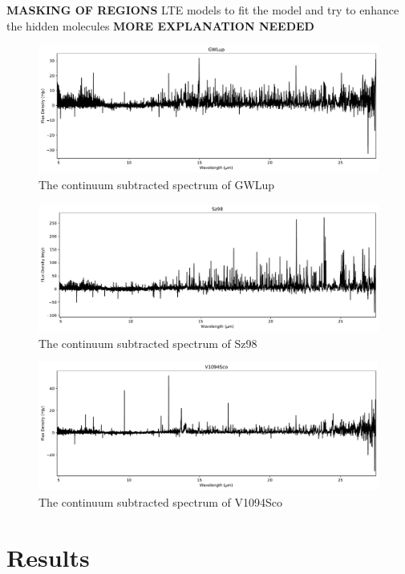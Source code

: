 \documentclass[oneside, single, authoryear, semicolon]{lion-msc}
\newcommand{\4}{$_4$}
\newcommand{\3}{$_3$}
\newcommand{\2}{$_2$}
\begin{document}
\textbf{MASKING OF REGIONS}
LTE models to fit the model and try to enhance the hidden molecules
\textbf{MORE EXPLANATION NEEDED}
\begin{figure}[!ht]
    \centering
    \includegraphics[width=\linewidth]{Figures/FullSpectrum_GWLup.pdf}
    \caption{The continuum subtracted spectrum of GWLup}
    \label{fig: GWLup}
\end{figure}
\begin{figure}[!ht]
    \centering
    \includegraphics[width=\linewidth]{Figures/FullSpectrum_Sz98.pdf}
    \caption{The continuum subtracted spectrum of Sz98}
    \label{fig: Sz98}
\end{figure}
\begin{figure}[!ht]
    \centering
    \includegraphics[width=\linewidth]{Figures/FullSpectrum_V1094Sco.pdf}
    \caption{The continuum subtracted spectrum of V1094Sco}
    \label{fig: V1094Sco}
\end{figure}



\chapter{Results}\label{Ch: Results}
\end{document}
